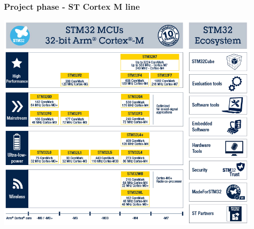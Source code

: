 \documentclass[11pt,xcolor=table,aspectratio=169]{beamer}
\begin{document}
	\begin{frame}
		\frametitle{Project phase - ST Cortex M line}
		\centering
		\includegraphics[width=.65\textwidth]{media/STCortex_small.png}
	\end{frame}
\end{document}
